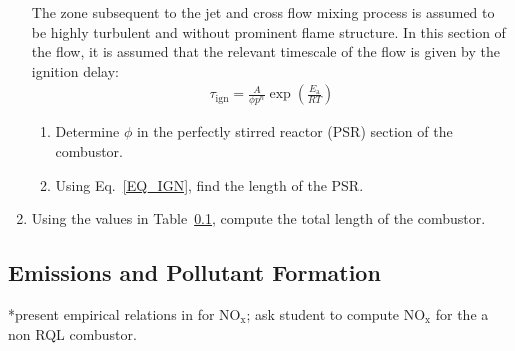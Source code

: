 \documentclass[11pt]{article}
\begin{document}
\begin{enumerate}[label=(\alph*)]
    	The zone subsequent to the jet and cross flow mixing process is assumed to be highly turbulent and without prominent flame structure. In this section of the flow, it is assumed that the relevant timescale of the flow is given by the ignition delay:
        \begin{equation}
          \label{EQ_IGN}
          \begin{aligned}
            \tau_\mathrm{ign}=\frac{A}{\phi p^n}\exp\left(\frac{E_\mathrm{a}}{RT}\right)
          \end{aligned}
        \end{equation}
        \begin{enumerate}[label=(\roman*)]
        \item
        	Determine $\phi$ in the perfectly stirred reactor (PSR) section of the combustor.
        \item
        	Using Eq.~\ref{EQ_IGN}, find the length of the PSR. 
        \end{enumerate}
	\item
    	Using the values in Table~\ref{}, compute the total length of the combustor.
\end{enumerate}
\subsection{Emissions and Pollutant Formation}
*present empirical relations in for NO$_\mathrm{x}$; ask student to compute NO$_\mathrm{x}$ for the a non RQL combustor.


\end{document}
